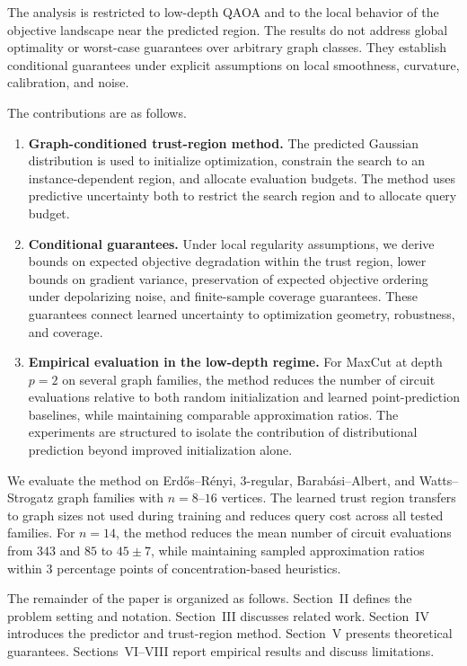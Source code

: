 \documentclass[aps,prx,reprint,superscriptaddress,longbibliography]{revtex4-2}
\newcommand{\QAOA}{\textnormal{\textsc{QAOA}}}
\begin{document}
The analysis is restricted to low-depth \QAOA{} and to the local
behavior of the objective landscape near the predicted region. The
results do not address global optimality or worst-case guarantees over
arbitrary graph classes. They establish conditional guarantees
under explicit assumptions on local smoothness, curvature,
calibration, and noise.

The contributions are as follows.

\begin{enumerate}[leftmargin=*,itemsep=2pt]
\item \textbf{Graph-conditioned trust-region method.}
    The predicted Gaussian distribution is used to initialize
    optimization, constrain the search to an instance-dependent region,
    and allocate evaluation budgets. The method uses predictive
    uncertainty both to restrict the search region and to allocate
    query budget.

\item \textbf{Conditional guarantees.}
    Under local regularity assumptions, we derive bounds on expected
    objective degradation within the trust region, lower bounds on
    gradient variance, preservation of expected objective ordering
    under depolarizing noise, and finite-sample coverage guarantees.
    These guarantees connect learned uncertainty to optimization
    geometry, robustness, and coverage.

\item \textbf{Empirical evaluation in the low-depth regime.}
    For MaxCut at depth $p{=}2$ on several graph families, the method
    reduces the number of circuit evaluations relative to both random
    initialization and learned point-prediction baselines, while
    maintaining comparable approximation ratios. The experiments are
    structured to isolate the contribution of distributional prediction
    beyond improved initialization alone.
\end{enumerate}

We evaluate the method on Erd\H{o}s--R\'enyi, 3-regular,
Barab\'asi--Albert, and Watts--Strogatz graph families with
$n{=}8$--$16$ vertices. The learned trust region transfers to graph
sizes not used during training and reduces query cost across all tested
families. For $n{=}14$, the method reduces the mean number of circuit
evaluations from $343$ and $85$ to $45\pm 7$, while maintaining sampled
approximation ratios within 3 percentage points of concentration-based
heuristics.

The remainder of the paper is organized as follows. Section~II defines
the problem setting and notation. Section~III discusses related work.
Section~IV introduces the predictor and trust-region method.
Section~V presents theoretical guarantees. Sections~VI--VIII report
empirical results and discuss limitations.
\end{document}
